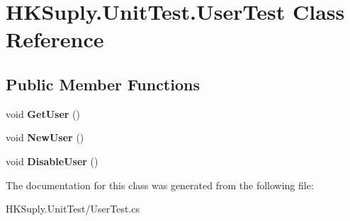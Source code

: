 \hypertarget{class_h_k_suply_1_1_unit_test_1_1_user_test}{}\section{H\+K\+Suply.\+Unit\+Test.\+User\+Test Class Reference}
\label{class_h_k_suply_1_1_unit_test_1_1_user_test}
\subsection*{Public Member Functions}
\begin{DoxyCompactItemize}
\item 
\mbox{\label{class_h_k_suply_1_1_unit_test_1_1_user_test_a0d33d16a2e9761ccdf686fc6398bd599}} 
void {\bfseries Get\+User} ()
\item 
\mbox{\label{class_h_k_suply_1_1_unit_test_1_1_user_test_a38a60511778b95f7cd2c256697cc4e6f}} 
void {\bfseries New\+User} ()
\item 
\mbox{\label{class_h_k_suply_1_1_unit_test_1_1_user_test_acc37fae05da85affd3a422b32bcd0700}} 
void {\bfseries Disable\+User} ()
\end{DoxyCompactItemize}


The documentation for this class was generated from the following file\+:\begin{DoxyCompactItemize}
\item 
H\+K\+Suply.\+Unit\+Test/User\+Test.\+cs\end{DoxyCompactItemize}
